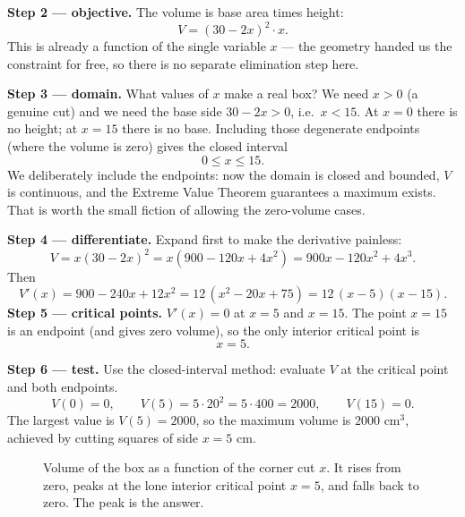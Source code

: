 \textbf{Step 2 --- objective.} The volume is base area times height:
\[
V = (30-2x)^2 \cdot x.
\]
This is already a function of the single variable $x$ --- the geometry handed us the
constraint for free, so there is no separate elimination step here.

\textbf{Step 3 --- domain.} What values of $x$ make a real box? We need $x>0$ (a
genuine cut) and we need the base side $30-2x>0$, i.e.\ $x<15$. At $x=0$ there is no
height; at $x=15$ there is no base. Including those degenerate endpoints (where the
volume is zero) gives the closed interval
\[
0 \le x \le 15.
\]
We deliberately include the endpoints: now the domain is closed and bounded, $V$ is
continuous, and the Extreme Value Theorem guarantees a maximum exists. That is worth
the small fiction of allowing the zero-volume cases.

\textbf{Step 4 --- differentiate.} Expand first to make the derivative painless:
\[
V = x(30-2x)^2 = x(900 - 120x + 4x^2) = 900x - 120x^2 + 4x^3.
\]
Then
\[
V'(x) = 900 - 240x + 12x^2 = 12\,(x^2 - 20x + 75) = 12\,(x-5)(x-15).
\]
\textbf{Step 5 --- critical points.} $V'(x)=0$ at $x=5$ and $x=15$. The point $x=15$
is an endpoint (and gives zero volume), so the only interior critical point is
\[
x = 5.
\]

\textbf{Step 6 --- test.} Use the closed-interval method: evaluate $V$ at the
critical point and both endpoints.
\[
V(0)=0, \qquad V(5) = 5\cdot 20^2 = 5\cdot 400 = 2000, \qquad V(15)=0.
\]
The largest value is $V(5)=2000$, so the maximum volume is $\boxed{2000\text{ cm}^3}$,
achieved by cutting squares of side $\boxed{x=5\text{ cm}}$.

\begin{figure}[H]
\centering
{}
\caption{Volume of the box as a function of the corner cut $x$. It rises from zero,
peaks at the lone interior critical point $x=5$, and falls back to zero. The peak is
the answer.}
\label{ch17:fig-box-volume}
\end{figure}

